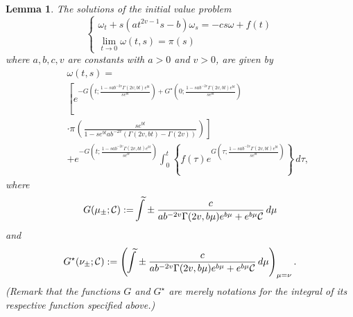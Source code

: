 \documentclass[preprint, 12pt]{elsarticle}
\numberwithin{equation}{section}
\theoremstyle{plain}
\newtheorem{lemma}{Lemma}[section]
\theoremstyle{remark}
\newcommand{\assign}{:=}
\newcommand{\nocomma}{}
\begin{document}
\begin{lemma} \label{lemma1}
The solutions of the initial value problem
\begin{equation} \label{IVP}
\left\{ \begin{array}{lll}
\omega_t + s (a t^{2 v - 1} s - b) \omega_s  =  - c s \omega + f (t)\\
\lim_{t \rightarrow 0} \omega (t, s) = \pi (s)
\end{array} \right.
\end{equation}
where $a, b, c, v$ are constants with $a>0$ and $v > 0$, are given by
\begin{eqnarray}
& & \omega (t, s) = \label{IVPsol}\\ 
& & \left[\displaystyle{e^{- G \left( t ; \frac{1 - s a b^{- 2 v} \Gamma (2 v \nocomma, b t) e^{b t}}{s e^{bt}} \right) + G^{\star} \left( 0 ; \frac{1 - s a b^{- 2 v} \Gamma (2 v \nocomma, b t) e^{b t}}{s e^{bt}} \right)}}\right.\nonumber\\ 
& & \left.\cdot \pi \left( \frac{s e^{bt}}{1 - s e^{bt} a b^{- 2 v}  (\Gamma (2 v \nocomma, b t) - \Gamma (2 v \nocomma))} \right)\right] \nonumber\\
&  & \displaystyle{+ e^{- G \left( t ; \frac{1 - s a b^{- 2 v} \Gamma (2 v \nocomma, b t) e^{b t}}{s e^{bt}} \right)} \int_0^t \left\{ f (\tau) e^{G \left( \tau ; \frac{1 - s a b^{- 2 v} \Gamma (2 v \nocomma, b t) e^{b t}}{s e^{bt}} \right)} \right\}\, d \tau}\nonumber, 
\end{eqnarray}
where
\[ G (\mu_{\pm} ; \mathcal{C}) \assign \kern6pt\widetilde{\kern-7pt\int} \pm \frac{c}{a b^{- 2 v} \Gamma (2 v, b \mu) e^{b \mu} + e^{b\mu} \mathcal{C}}\, d \mu \]
and
\[ G^{\star} (\nu_{\pm} ; \mathcal{C}) \assign  \left(\kern6pt \widetilde{\kern-7pt\int} \pm \frac{c}{a b^{- 2 v} \Gamma (2 v, b \mu) e^{b \mu} +e^{b\mu} \mathcal{C}}\, d \mu \right)_{\mu = \nu}. \]
(Remark that the functions $G$ and $G^{\star}$ are merely notations for the integral of its respective function specified above.)
\end{lemma}
\end{document}
